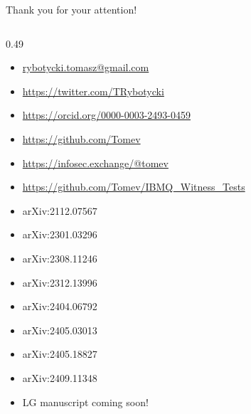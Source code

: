 \documentclass{beamer}
\begin{document}
	\begin{frame}{Thank you for your attention!}
	
		
	
		\begin{columns}
			
			\begin{column}{0.49\linewidth}
				
				\tiny
				
				\begin{block}
					
					\begin{itemize}
						
						\item \url{rybotycki.tomasz@gmail.com}
						
						\item \url{https://twitter.com/TRybotycki}
						
						\item \url{https://orcid.org/0000-0003-2493-0459}
						
						\item \url{https://github.com/Tomev}
						
						\item \url{https://infosec.exchange/@tomev}
						
					\end{itemize}
					
				\end{block}
				
				\vspace{0.5cm}
				
				\begin{block}

					\begin{itemize}
						\item \url{https://github.com/Tomev/IBMQ_Witness_Tests}
						\item arXiv:2112.07567
						\item arXiv:2301.03296 
						\item arXiv:2308.11246 
						\item arXiv:2312.13996  
						\item arXiv:2404.06792
						\item arXiv:2405.03013 
						\item arXiv:2405.18827  
						\item arXiv:2409.11348 
						\item LG manuscript coming soon!
					\end{itemize}
					

\end{block}
\end{column}
\end{columns}
\end{frame}
\end{document}
